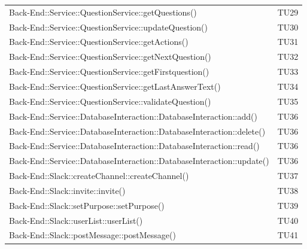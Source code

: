 \documentclass[../PianoDiQualifica_v4.0.0.tex]{subfiles}
\begin{document}
\begin{longtable}[c] {>{\centering\arraybackslash}p{} >{\centering\arraybackslash}p{}}
			\midrule
			\addlinespace[0.3em]
 			Back-End::Service::QuestionService::getQuestions() & TU29 \\
 			\addlinespace[0.3em]
			\midrule
			\addlinespace[0.3em]
 			Back-End::Service::QuestionService::updateQuestion() & TU30 \\
 			\addlinespace[0.3em]
			\midrule
			\addlinespace[0.3em]
 			Back-End::Service::QuestionService::getActions() & TU31 \\
 			\addlinespace[0.3em]
			\midrule
			\addlinespace[0.3em]
			Back-End::Service::QuestionService::getNextQuestion() & TU32 \\
 			\addlinespace[0.3em]
			\midrule
			\addlinespace[0.3em]
 			Back-End::Service::QuestionService::getFirstquestion() & TU33 \\
 			\addlinespace[0.3em]
			\midrule
			\addlinespace[0.3em]
 			Back-End::Service::QuestionService::getLastAnswerText() & TU34\\
 			\addlinespace[0.3em]
			\midrule
			\addlinespace[0.3em]
			Back-End::Service::QuestionService::validateQuestion() & TU35 \\
 			\addlinespace[0.3em]
			\midrule
			\addlinespace[0.3em]
 			Back-End::Service::DatabaseInteraction::DatabaseInteraction::add() & TU36 \\
 			\addlinespace[0.3em]
			\midrule
			\addlinespace[0.3em]
			Back-End::Service::DatabaseInteraction::DatabaseInteraction::delete() & TU36 \\
 			\addlinespace[0.3em]
			\midrule
			\addlinespace[0.3em]
 			Back-End::Service::DatabaseInteraction::DatabaseInteraction::read() & TU36 \\
 			\addlinespace[0.3em]
			\midrule
			\addlinespace[0.3em]
 			Back-End::Service::DatabaseInteraction::DatabaseInteraction::update() & TU36 \\
			\addlinespace[0.3em]
			\midrule
			\addlinespace[0.3em]
 			Back-End::Slack::createChannel::createChannel() & TU37 \\
 			\addlinespace[0.3em]
			\midrule
			\addlinespace[0.3em]
 			Back-End::Slack::invite::invite() & TU38 \\
 			\addlinespace[0.3em]
			\midrule
			\addlinespace[0.3em]
 			Back-End::Slack::setPurpose::setPurpose() & TU39 \\
			\addlinespace[0.3em]
			\midrule
			\addlinespace[0.3em]
 			Back-End::Slack::userList::userList() & TU40 \\
 			\addlinespace[0.3em]
			\midrule
			\addlinespace[0.3em]
			Back-End::Slack::postMessage::postMessage() & TU41 \\

\end{longtable}
\end{document}
